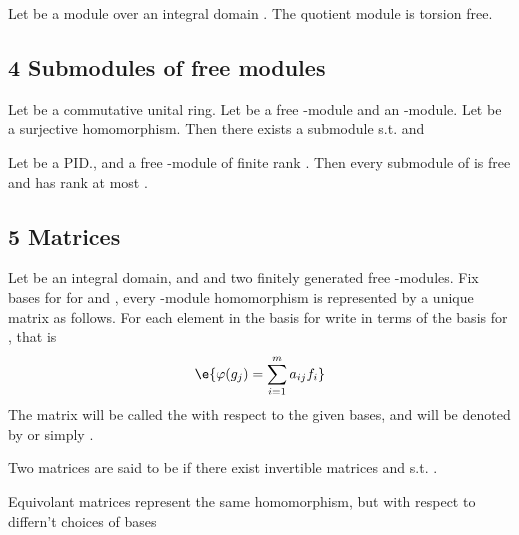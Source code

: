 \begin{Le}
\begin{A}
\begin{Pp} Let  be a module over an integral domain . The quotient module  is torsion free. \end{Pp}

\subsection{4 Submodules of free modules}
\begin{Le} Let  be a commutative unital ring. Let  be a free -module and  an -module. Let  be a surjective homomorphism. Then there exists a submodule  s.t.  and  \end{Le}

\begin{T} Let  be a PID., and  a free -module of finite rank . Then every submodule of  is free and has rank at most . \end{T}

\subsection{5 Matrices}
\begin{D}
Let  be an integral domain, and  and  two finitely generated free -modules. Fix bases for  for  and , every -module homomorphism  is represented by a unique matrix  as follows. For each element  in the basis for  write  in terms of the basis for , that is 
$$\e{\varphi(g_j)=\sum_{i=1}^ma_{ij}f_i}$$
The matrix  will be called the  \e{$\varphi$} with respect to the given bases, and will be denoted by  or simply \e{$[\varphi]$}. \end{D}

\begin{D} Two matrices  are said to be  if there exist invertible matrices  and  s.t. . \end{D}
\begin{R} Equivolant matrices represent the same homomorphism, but with respect to differn't choices of bases \end{R}


\end{A}
\end{Le}
